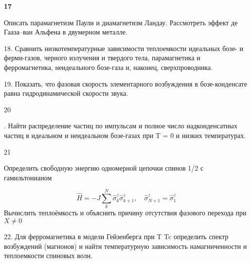 \documentclass[a4paper,12pt]{article} %
\begin{document}
\begin{ttask} \textbf{17}


Описать парамагнетизм Паули и диамагнетизм Ландау. 
Рассмотреть эффект де Гааза–ван Альфена в двумерном металле. 





\end{ttask}


\begin{ttask}

18. Сравнить низкотемпературные зависимости теплоемкости идеальных бозе- и ферми-газов, черного излучения и твердого тела, парамагнетика и ферромагнетика, неидеального бозе-газа и, наконец, сверхпроводника. 


\end{ttask}






\begin{ttask}

19. Показать, что фазовая скорость элементарного возбуждения в бозе-конденсате равна гидродинамической скорости звука.


\end{ttask}



\begin{ttask}

20

. Найти распределение частиц по импульсам и полное число надконденсатных частиц в идеальном и неидеальном бозе-газах при T = 0 и низких температурах.


\end{ttask}



\begin{ttask}

21

Определить свободную энергию одномерной цепочки спинов 1/2 с гамильтонианом

$$\hat{H}=-J \sum_{k}^{N} \hat{\sigma}_{k}^{z} \hat{\sigma}_{k+1}^{z}, \quad \hat{\sigma}_{N+1}^{z}=\hat{\sigma}_{1}^{z}$$
Вычислить теплоёмкость и объяснить причину отсутствия фазового перехода при $ X\ne 0 $
\end{ttask}



\begin{ttask}

22. Для ферромагнетика в модели Гейзенберга при T  Tc определить спектр возбуждений (магнонов) и найти температурную зависимость намагниченности и теплоемкости спиновых волн.

\end{ttask}
\end{document}
